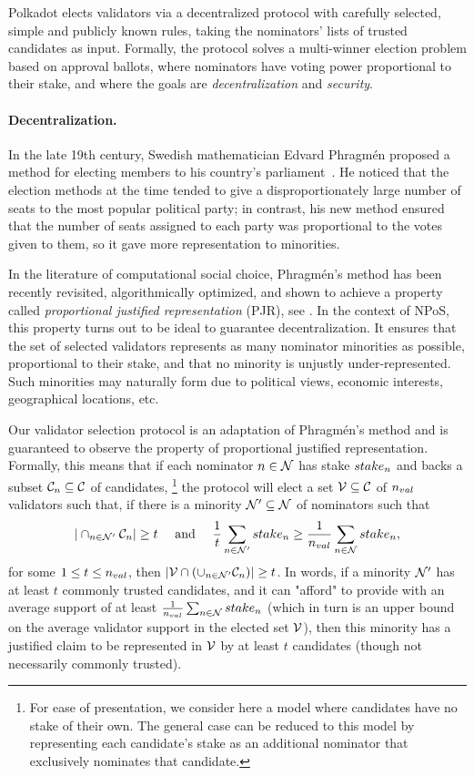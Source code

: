 Polkadot elects validators via a decentralized protocol with carefully selected, simple and publicly known rules,
taking the nominators' lists of trusted candidates as input. Formally, the protocol solves a multi-winner election
problem based on approval ballots, where nominators have voting power proportional to their stake,
and where the goals are \emph{decentralization} and \emph{security}.

\paragraph{Decentralization.} In the late 19th century, Swedish mathematician Edvard Phragm\'{e}n
proposed a method for electing members to his country’s parliament~\cite{brill2017phragmen}.
He noticed that the election methods at the time tended to give a disproportionately large number of seats 
to the most popular political party; in contrast, his new method ensured that the number of seats
assigned to each party was proportional to the votes given to them, so it gave more representation to minorities.

In the literature of computational social choice, Phragm\'{e}n's method has been recently revisited, 
algorithmically optimized, and shown to achieve a property called \emph{proportional justified representation} (PJR), 
see \cite{sanchez2017proportional, brill2017phragmen}.
In the context of NPoS, this property turns out to be ideal to guarantee decentralization.
It ensures that the set of selected validators represents as many nominator minorities as possible,
proportional to their stake, and that no minority is unjustly under-represented.
Such minorities may naturally form due to political views, economic interests, geographical locations, etc.

Our validator selection protocol is an adaptation of Phragm\'{e}n's method and is guaranteed 
to observe the property of proportional justified representation. 
Formally, this means that if each nominator $n \in \mathcal{N}$ has stake $stake_{n}$ 
and backs a subset $\mathcal{C}_{n}\subseteq \mathcal{C}$ of candidates,%
%
\footnote{For ease of presentation, we consider here a model where candidates have no stake of their own. 
The general case can be reduced to this model by representing each candidate's stake as an additional nominator 
that exclusively nominates that candidate.} %
%
the protocol will elect a set $\mathcal{V}\subseteq \mathcal{C}$ of $n_{val}$ validators such that, 
if there is a minority $\mathcal{N}'\subseteq \mathcal{N}$ of nominators such that %
%
$$|\cap_{n\in \mathcal{N}'} \mathcal{C}_n| \geq t \quad \text{ and } \quad
\frac{1}{t} \sum_{n\in \mathcal{N}'} stake_{n} \geq \frac{1}{n_{val}} \sum_{n\in \mathcal{N}} stake_{n},$$
%
for some $1\leq t\leq n_{val}$, then $|\mathcal{V}\cap (\cup_{n\in\mathcal{N}'} \mathcal{C}_n)| \geq t$.
In words, if a minority $\mathcal{N}'$ has at least $t$ commonly trusted candidates, 
and it can "afford" to provide with an average support of at least $\frac{1}{n_{val}} \sum_{n\in \mathcal{N}} stake_{n}$ 
(which in turn is an upper bound on the average validator support in the elected set $\mathcal{V}$), 
then this minority has a justified claim to be represented in $\mathcal{V}$ by at least $t$ candidates 
(though not necessarily commonly trusted).

